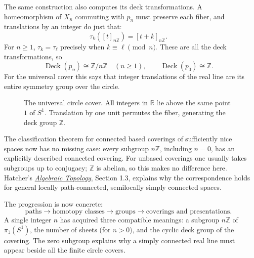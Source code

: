 The same construction also computes its deck transformations. A homeomorphism of $X_n$ commuting with $p_n$ must preserve each fiber, and translations by an integer do just that:
\[
 \tau_k([t]_{n\mathbb Z})=[t+k]_{n\mathbb Z}.
\]
For $n\ge1$, $\tau_k=\tau_\ell$ precisely when $k\equiv\ell\pmod n$. These are all the deck transformations, so
\[
 \boxed{\operatorname{Deck}(p_n)\cong\mathbb Z/n\mathbb Z
 \quad(n\ge1),\qquad
 \operatorname{Deck}(p_0)\cong\mathbb Z.}
\]
For the universal cover this says that integer translations of the real line are its entire symmetry group over the circle.

\begin{figure}[H]
\centering
{}
\caption{The universal circle cover. All integers in $\mathbb R$ lie above the same point $1$ of $S^1$. Translation by one unit permutes the fiber, generating the deck group $\mathbb Z$.}
\end{figure}

The classification theorem for connected based coverings of sufficiently nice spaces now has no missing case: every subgroup $n\mathbb Z$, including $n=0$, has an explicitly described connected covering. For unbased coverings one usually takes subgroups up to conjugacy; $\mathbb Z$ is abelian, so this makes no difference here. Hatcher's \href{https://pi.math.cornell.edu/~hatcher/AT/AT-doublepage.pdf}{\emph{Algebraic Topology}}, Section 1.3, explains why the correspondence holds for general locally path-connected, semilocally simply connected spaces.

The progression is now concrete:
\[
 \text{paths}\longrightarrow\text{homotopy classes}
 \longrightarrow\text{groups}
 \longrightarrow\text{coverings and presentations}.
\]
A single integer $n$ has acquired three compatible meanings: a subgroup $n\mathbb Z$ of $\pi_1(S^1)$, the number of sheets (for $n>0$), and the cyclic deck group of the covering. The zero subgroup explains why a simply connected real line must appear beside all the finite circle covers.
